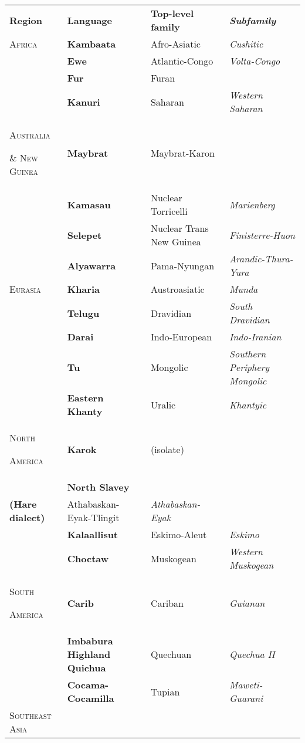 \begin{table}
\begin{tabularx}{\textwidth}{XXXX}
\lsptoprule

\textbf{Region} & \textbf{Language} & \textbf{Top-level family} & \textbf{\textit{Subfamily}}\\
\textsc{Africa} & \textbf{Kambaata} & Afro-Asiatic & \textit{Cushitic}\\
\hhline{-~~~} & \textbf{Ewe} & Atlantic-Congo & \textit{Volta-Congo}\\
& \textbf{Fur} & Furan & \\
& \textbf{Kanuri} & Saharan & \textit{Western Saharan}\\
\textsc{Australia} 

\textsc{\&} \textsc{New} \textsc{Guinea} & \textbf{Maybrat} & Maybrat-Karon & \\
\hhline{-~~~} & \textbf{Kamasau} & Nuclear Torricelli & \textit{Marienberg}\\
& \textbf{Selepet} & Nuclear Trans New Guinea & \textit{Finisterre-Huon}\\
& \textbf{Alyawarra} & Pama-Nyungan & \textit{Arandic-Thura-Yura}\\
\textsc{Eurasia} & \textbf{Kharia} & Austroasiatic & \textit{Munda}\\
\hhline{-~~~} & \textbf{Telugu} & Dravidian & \textit{South Dravidian}\\
& \textbf{Darai} & Indo-European & \textit{Indo-Iranian}\\
& \textbf{Tu} & Mongolic & \textit{Southern Periphery Mongolic}\\
& \textbf{Eastern Khanty} & Uralic & \textit{Khantyic}\\
\textsc{North} 

\textsc{America} & \textbf{Karok} & (isolate) & \\
\hhline{-~~~} & \textbf{North Slavey} \\
\textbf{(Hare dialect)} & Athabaskan-Eyak-Tlingit & \textit{Athabaskan-Eyak}\\
& \textbf{Kalaallisut} & Eskimo-Aleut & \textit{Eskimo}\\
& \textbf{Choctaw} & Muskogean & \textit{Western Muskogean}\\
\textsc{South} 

\textsc{America} & \textbf{Carib} & Cariban & \textit{Guianan}\\
\hhline{-~~~} & \textbf{Imbabura Highland Quichua} & Quechuan & \textit{Quechua II}\\
& \textbf{Cocama-Cocamilla} & Tupian & \textit{Maweti-Guarani}\\
\textsc{Southeast} \textsc{Asia} 


\end{tabularx}
\end{table}
